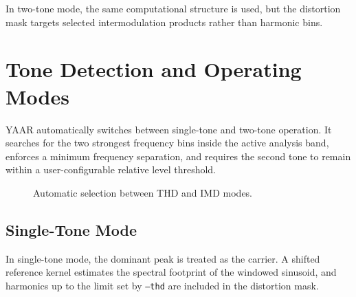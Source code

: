 \documentclass[conference]{IEEEtran}
\begin{document}
In two-tone mode, the same computational structure is used, but the distortion mask targets selected intermodulation products rather than harmonic bins.

\section{Tone Detection and Operating Modes}
YAAR automatically switches between single-tone and two-tone operation. It searches for the two strongest frequency bins inside the active analysis band, enforces a minimum frequency separation, and requires the second tone to remain within a user-configurable relative level threshold.

\begin{figure}[t]
\centering
{}
\caption{Automatic selection between THD and IMD modes.}
\label{fig:mode}
\end{figure}

\subsection{Single-Tone Mode}
In single-tone mode, the dominant peak is treated as the carrier. A shifted reference kernel estimates the spectral footprint of the windowed sinusoid, and harmonics up to the limit set by \texttt{--thd} are included in the distortion mask.
\end{document}
